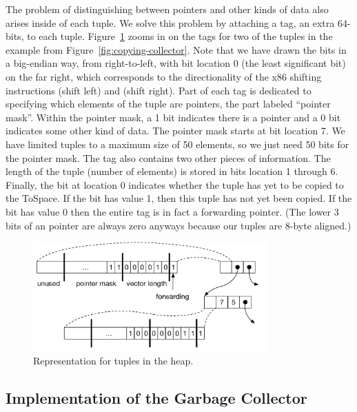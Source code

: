 \documentclass[11pt]{book}
\begin{document}
The problem of distinguishing between pointers and other kinds of data
also arises inside of each tuple. We solve this problem by attaching a
tag, an extra 64-bits, to each tuple. Figure~\ref{fig:tuple-rep} zooms
in on the tags for two of the tuples in the example from
Figure~\ref{fig:copying-collector}. Note that we have drawn the bits
in a big-endian way, from right-to-left, with bit location 0 (the
least significant bit) on the far right, which corresponds to the
directionality of the x86 shifting instructions  (shift
left) and  (shift right). Part of each tag is dedicated to
specifying which elements of the tuple are pointers, the part labeled
``pointer mask''. Within the pointer mask, a 1 bit indicates there is
a pointer and a 0 bit indicates some other kind of data. The pointer
mask starts at bit location 7. We have limited tuples to a maximum
size of 50 elements, so we just need 50 bits for the pointer mask. The
tag also contains two other pieces of information. The length of the
tuple (number of elements) is stored in bits location 1 through
6. Finally, the bit at location 0 indicates whether the tuple has yet
to be copied to the ToSpace.  If the bit has value 1, then this tuple
has not yet been copied.  If the bit has value 0 then the entire tag
is in fact a forwarding pointer. (The lower 3 bits of an pointer are
always zero anyways because our tuples are 8-byte aligned.)

\begin{figure}[tbp]
\centering \includegraphics[width=0.8\textwidth]{figs/tuple-rep}
\caption{Representation for tuples in the heap.}
\label{fig:tuple-rep}
\end{figure}

\subsection{Implementation of the Garbage Collector}
\label{sec:organize-gz}
\end{document}
